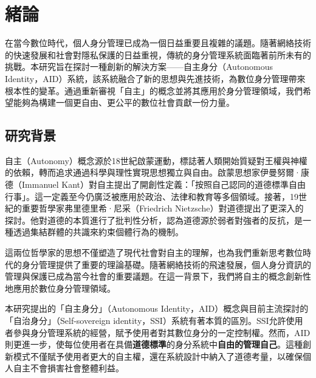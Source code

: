 
\chapter{緒論}
在當今數位時代，個人身分管理已成為一個日益重要且複雜的議題。隨著網絡技術的快速發展和社會對隱私保護的日益重視，傳統的身分管理系統面臨著前所未有的挑戰。本研究旨在探討一種創新的解決方案——自主身分（Autonomous Identity，AID）系統，該系統融合了新的思想與先進技術，為數位身分管理帶來根本性的變革。通過重新審視「自主」的概念並將其應用於身分管理領域，我們希望能夠為構建一個更自由、更公平的數位社會貢獻一份力量。
\section{研究背景}
自主（Autonomy）概念源於18世紀啟蒙運動，標誌著人類開始質疑對王權與神權的依賴，轉而追求通過科學與理性實現思想獨立與自由。啟蒙思想家伊曼努爾·康德（Immanuel Kant）對自主提出了開創性定義：「按照自己認同的道德標準自由行事」。這一定義至今仍廣泛被應用於政治、法律和教育等多個領域。接著，19世紀的重要哲學家弗里德里希·尼采（Friedrich Nietzsche）對道德提出了更深入的探討。他對道德的本質進行了批判性分析，認為道德源於弱者對強者的反抗，是一種透過集結群體的共識來約束個體行為的機制。

這兩位哲學家的思想不僅塑造了現代社會對自主的理解，也為我們重新思考數位時代的身分管理提供了重要的理論基礎。隨著網絡技術的飛速發展，個人身分資訊的管理與保護已成為當今社會的重要議題。在這一背景下，我們將自主的概念創新性地應用於數位身分管理領域。

本研究提出的「自主身分」（Autonomous Identity，AID）概念與目前主流探討的「自治身分」（Self-sovereign identity，SSI）系統有著本質的區別。SSI允許使用者參與身分管理系統的經營，賦予使用者對其數位身分的一定控制權。然而，AID則更進一步，使每位使用者在具備\textbf{道德標準}的身分系統中\textbf{自由的管理自己}。這種創新模式不僅賦予使用者更大的自主權，還在系統設計中納入了道德考量，以確保個人自主不會損害社會整體利益。
